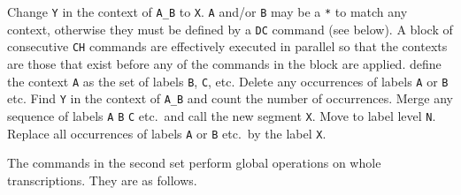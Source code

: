 \begin{varlist}
         Change \texttt{Y} in the context of \texttt{A\_B} 
      to \texttt{X}.  \texttt{A} and/or \texttt{B} may be a \texttt{*} to match 
      any context, otherwise they must be defined by a \texttt{DC} command
      (see below).  A
      block of consecutive \texttt{CH} commands are effectively executed in
      parallel so that the contexts are those that exist before any of
      the commands in the block are applied.
        define the context \texttt{A} as the set of labels
        \texttt{B}, \texttt{C}, etc.   
        Delete any occurrences of labels \texttt{A}
        or \texttt{B} etc. 
     Find \texttt{Y} in the context of \texttt{A\_B} 
      and count the number of occurrences.
        Merge any sequence of labels \texttt{A}
       \texttt{B} \texttt{C} etc.\  and call the new segment \texttt{X}.
    Move to label level \texttt{N}.
      Replace all occurrences of labels \texttt{A}
      or \texttt{B} etc.\ by the label \texttt{X}.
\end{varlist}

The commands in the second set perform global operations on whole
transcriptions.  They are as follows.

